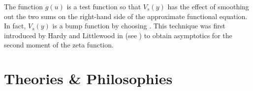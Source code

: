 \documentclass[12pt,oneside]{book}
\begin{document}
      The function $g(u)$ is a test function so that $V_{s}(y)$ has the effect of smoothing out the two sums on the right-hand side of the approximate functional equation. In fact, $V_{s}(y)$ is a bump function by choosing . This technique was first introduced by Hardy and Littlewood in  (see ) to obtain asymptotics for the second moment of the zeta function.
  \chapter{Theories \& Philosophies}

  
\end{document}
